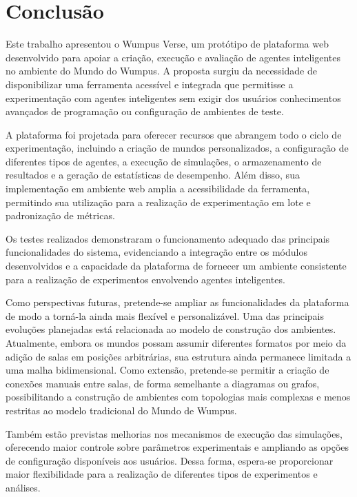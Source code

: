 \section{Conclusão}

Este trabalho apresentou o Wumpus Verse, um protótipo de plataforma web desenvolvido para apoiar a criação, execução e avaliação de agentes inteligentes no ambiente do Mundo do Wumpus. A proposta surgiu da necessidade de disponibilizar uma ferramenta acessível e integrada que permitisse a experimentação com agentes inteligentes sem exigir dos usuários conhecimentos avançados de programação ou configuração de ambientes de teste.

A plataforma foi projetada para oferecer recursos que abrangem todo o ciclo de experimentação, incluindo a criação de mundos personalizados, a configuração de diferentes tipos de agentes, a execução de simulações, o armazenamento de resultados e a geração de estatísticas de desempenho. Além disso, sua implementação em ambiente web amplia a acessibilidade da ferramenta, permitindo sua utilização para a realização de experimentação em lote e padronização de métricas.

Os testes realizados demonstraram o funcionamento adequado das principais funcionalidades do sistema, evidenciando a integração entre os módulos desenvolvidos e a capacidade da plataforma de fornecer um ambiente consistente para a realização de experimentos envolvendo agentes inteligentes.

Como perspectivas futuras, pretende-se ampliar as funcionalidades da plataforma de modo a torná-la ainda mais flexível e personalizável. Uma das principais evoluções planejadas está relacionada ao modelo de construção dos ambientes. Atualmente, embora os mundos possam assumir diferentes formatos por meio da adição de salas em posições arbitrárias, sua estrutura ainda permanece limitada a uma malha bidimensional. Como extensão, pretende-se permitir a criação de conexões manuais entre salas, de forma semelhante a diagramas ou grafos, possibilitando a construção de ambientes com topologias mais complexas e menos restritas ao modelo tradicional do Mundo de Wumpus.

Também estão previstas melhorias nos mecanismos de execução das simulações, oferecendo maior controle sobre parâmetros experimentais e ampliando as opções de configuração disponíveis aos usuários. Dessa forma, espera-se proporcionar maior flexibilidade para a realização de diferentes tipos de experimentos e análises.

